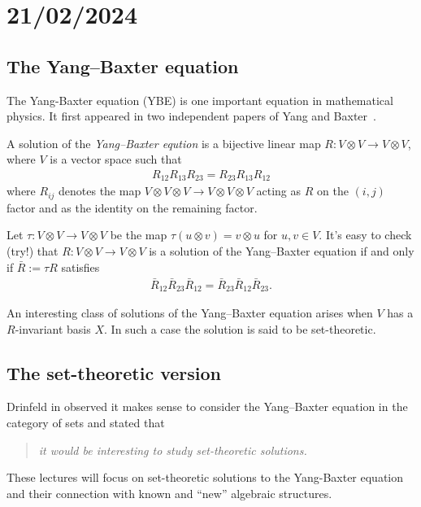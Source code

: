 \section{21/02/2024}

\subsection{The Yang--Baxter equation}
The Yang-Baxter equation (YBE) is one important equation in mathematical physics.
It first appeared in two independent papers of Yang \cite{Yang1967} and Baxter\
\cite{Baxter1971}.

\begin{definition}
    A solution of the \emph{Yang--Baxter eqution} is a bijective linear map  $R: V\otimes V \to V \otimes V$, where $V$ is a vector space such that
    \begin{align*}
        R_{12}R_{13}R_{23} = R_{23}R_{13}R_{12}
    \end{align*}
    where $R_{ij}$ denotes the map $V\otimes V\otimes V \to V \otimes V \otimes V$ acting as $R$ on the $(i,j)$
    factor and as the identity on the remaining factor.
\end{definition}
    Let $\tau: V\otimes V \to V \otimes V$ be the map $\tau(u\otimes v) = v \otimes u$ for $u,v \in V$.
    It's easy to check (try!) that $R: V \otimes V \to V \otimes V$ is a solution of the Yang--Baxter equation if and only if $\bar{R}:=\tau R$ satisfies 
    \begin{align*}
        \bar{R}_{12}\bar{R}_{23}\bar{R}_{12}=\bar{R}_{23}\bar{R}_{12}\bar{R}_{23}.
    \end{align*}

    An interesting class of solutions of the Yang--Baxter equation arises when $V$ has a $R$-invariant basis $X$. In such a case the solution is said to be set-theoretic. 

\subsection{The set-theoretic version}
    Drinfeld in \cite{Dri1992} observed it makes sense to consider the Yang--Baxter equation in the category of sets and stated that 

    
    \begin{quote}\textit{it would be interesting to study set-theoretic solutions.}\end{quote}
    

    These lectures will focus on set-theoretic solutions to the Yang-Baxter equation and their connection with known and ``new'' algebraic structures. 

